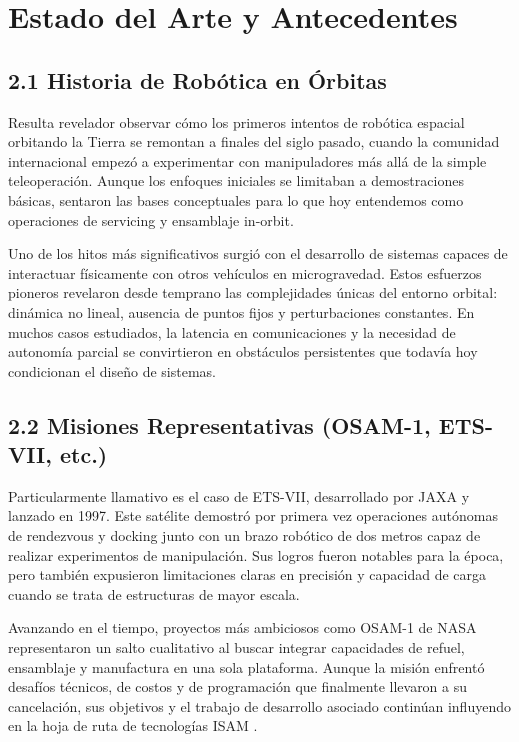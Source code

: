 \section{Estado del Arte y Antecedentes}

\subsection{2.1 Historia de Robótica en Órbitas}

Resulta revelador observar cómo los primeros intentos de robótica espacial orbitando la Tierra se remontan a finales del siglo pasado, cuando la comunidad internacional empezó a experimentar con manipuladores más allá de la simple teleoperación. Aunque los enfoques iniciales se limitaban a demostraciones básicas, sentaron las bases conceptuales para lo que hoy entendemos como operaciones de servicing y ensamblaje in-orbit.

Uno de los hitos más significativos surgió con el desarrollo de sistemas capaces de interactuar físicamente con otros vehículos en microgravedad. Estos esfuerzos pioneros revelaron desde temprano las complejidades únicas del entorno orbital: dinámica no lineal, ausencia de puntos fijos y perturbaciones constantes. En muchos casos estudiados, la latencia en comunicaciones y la necesidad de autonomía parcial se convirtieron en obstáculos persistentes que todavía hoy condicionan el diseño de sistemas.

\subsection{2.2 Misiones Representativas (OSAM-1, ETS-VII, etc.)}

Particularmente llamativo es el caso de ETS-VII, desarrollado por JAXA y lanzado en 1997. Este satélite demostró por primera vez operaciones autónomas de rendezvous y docking junto con un brazo robótico de dos metros capaz de realizar experimentos de manipulación. Sus logros fueron notables para la época, pero también expusieron limitaciones claras en precisión y capacidad de carga cuando se trata de estructuras de mayor escala.

Avanzando en el tiempo, proyectos más ambiciosos como OSAM-1 de NASA representaron un salto cualitativo al buscar integrar capacidades de refuel, ensamblaje y manufactura en una sola plataforma. Aunque la misión enfrentó desafíos técnicos, de costos y de programación que finalmente llevaron a su cancelación, sus objetivos y el trabajo de desarrollo asociado continúan influyendo en la hoja de ruta de tecnologías ISAM \cite{NASA_ISAM2025}. 

